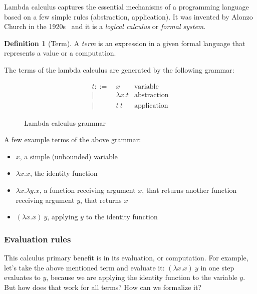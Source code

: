 \documentclass[12pt]{article}
\theoremstyle{definition}
\newtheorem{definition}{Definition}[section]
\begin{document}
Lambda calculus captures the essential mechanisms of a programming language based on a few simple rules (abstraction, application). It was invented by Alonzo Church in the 1920s~\cite{tapl} and it is a \emph{logical calculus} or \emph{formal system}.

\begin{definition}[Term]
       A \emph{term} is an expression in a given formal language that represents a value or a computation.
\end{definition}

The terms of the lambda calculus are generated by the following grammar:

\begin{figure}[H]
       \begin{equation*}
              \begin{aligned}
                     t ::= & \ x            & \text{variable}    \\
                     |     & \  \lambda x.t & \text{abstraction} \\
                     |     & \  t\ t        & \text{application}
              \end{aligned}
       \end{equation*}
       \caption{Lambda calculus grammar}\label{fig:lambda-calc-grammar}
\end{figure}

A few example terms of the above grammar:

\begin{itemize}
       \item $x$, a simple (unbounded) variable
       \item $\lambda x.x$, the identity function
       \item $\lambda x.\lambda y.x$, a function receiving argument $x$, that returns another function receiving argument $y$, that returns $x$
       \item $(\lambda x.x)\ y$, applying $y$ to the identity function
\end{itemize}

\subsubsection{Evaluation rules}
\label{evaluation-rules}

This calculus primary benefit is in its evaluation, or computation.
For example, let's take the above mentioned term and evaluate it: $(\lambda x.x)\ y$ in one step evaluates to $y$, because we are applying the identity function to the variable $y$.
But how does that work for all terms? How can we formalize it?
\end{document}
